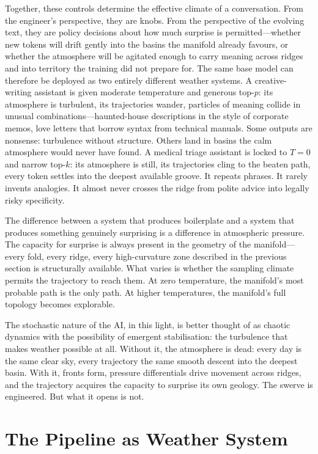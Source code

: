 Together, these controls determine the effective climate of a conversation. From the engineer's perspective, they are knobs. From the perspective of the evolving text, they are policy decisions about how much surprise is permitted---whether new tokens will drift gently into the basins the manifold already favours, or whether the atmosphere will be agitated enough to carry meaning across ridges and into territory the training did not prepare for.
The same base model can therefore be deployed as two entirely different weather systems. A creative-writing assistant is given moderate temperature and generous top-$p$: its atmosphere is turbulent, its trajectories wander, particles of meaning collide in unusual combinations---haunted-house descriptions in the style of corporate memos, love letters that borrow syntax from technical manuals. Some outputs are nonsense: turbulence without structure. Others land in basins the calm atmosphere would never have found. A medical triage assistant is locked to $T=0$ and narrow top-$k$: its atmosphere is still, its trajectories cling to the beaten path, every token settles into the deepest available groove. It repeats phrases. It rarely invents analogies. It almost never crosses the ridge from polite advice into legally risky specificity.

The difference between a system that produces boilerplate and a system that produces something genuinely surprising is a difference in atmospheric pressure. The capacity for surprise is always present in the geometry of the manifold---every fold, every ridge, every high-curvature zone described in the previous section is structurally available. What varies is whether the sampling climate permits the trajectory to reach them. At zero temperature, the manifold's most probable path is the only path. At higher temperatures, the manifold's full topology becomes explorable.

The stochastic nature of the AI, in this light, is better thought of as chaotic dynamics with the possibility of emergent stabilisation: the turbulence that makes weather possible at all. Without it, the atmosphere is dead: every day is the same clear sky, every trajectory the same smooth descent into the deepest basin. With it, fronts form, pressure differentials drive movement across ridges, and the trajectory acquires the capacity to surprise its own geology. The swerve is engineered. But what it opens is not.

\section{The Pipeline as Weather System}


